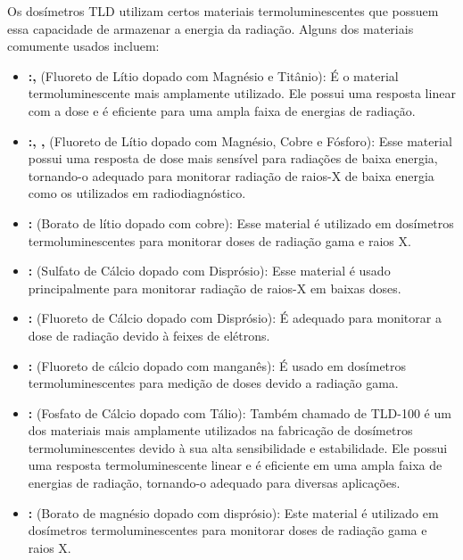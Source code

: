 \documentclass[11pt,a4paper]{article}
\begin{document}
		Os dosímetros TLD utilizam certos materiais termoluminescentes que possuem essa capacidade de armazenar a energia da radiação. Alguns dos materiais comumente usados incluem:

		\begin{itemize}[label=\textcolor{CarnationPink}{$\star$}]
			\item \textbf{:, } (Fluoreto de Lítio dopado com Magnésio e Titânio): É o material termoluminescente mais amplamente utilizado. Ele possui uma resposta linear com a dose e é eficiente para uma ampla faixa de energias de radiação.
			
			\item \textbf{:, , } (Fluoreto de Lítio dopado com Magnésio, Cobre e Fósforo): Esse material possui uma resposta de dose mais sensível para radiações de baixa energia, tornando-o adequado para monitorar radiação de raios-X de baixa energia como os utilizados em radiodiagnóstico.
			
			\item \textbf{:} (Borato de lítio dopado com cobre): Esse material é utilizado em dosímetros termoluminescentes para monitorar doses de radiação gama e raios X.
			
			\item \textbf{:} (Sulfato de Cálcio dopado com Disprósio): Esse material é usado principalmente para monitorar radiação de raios-X em baixas doses.
			
			\item \textbf{:} (Fluoreto de Cálcio dopado com Disprósio): É adequado para monitorar a dose de radiação devido à feixes de elétrons.
			
			\item \textbf{:} (Fluoreto de cálcio dopado com manganês): É usado em dosímetros termoluminescentes para medição de doses devido a radiação gama.
			
			\item \textbf{:} (Fosfato de Cálcio dopado com Tálio): Também chamado de TLD-100 é um dos materiais mais amplamente utilizados na fabricação de dosímetros termoluminescentes devido à sua alta sensibilidade e estabilidade. Ele possui uma resposta termoluminescente linear e é eficiente em uma ampla faixa de energias de radiação, tornando-o adequado para diversas aplicações.
			
			\item \textbf{:} (Borato de magnésio dopado com disprósio): Este material é utilizado em dosímetros termoluminescentes para monitorar doses de radiação gama e raios X.
		\end{itemize}
\end{document}
